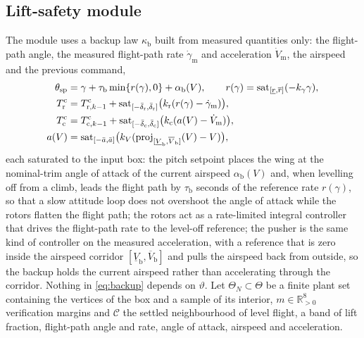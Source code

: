\subsection{Lift-safety module}\label{sec:lsm}
The module uses a backup law $\kappa_{\mathrm b}$ built from measured quantities only: the flight-path angle, the measured flight-path rate $\dot\gamma_{\mathrm m}$ and acceleration $\dot V_{\mathrm m}$, the airspeed and the previous command,
\begin{subequations}\label{eq:backup}
\begin{align}
\theta_{\mathrm{sp}}&=\gamma+\tau_{\mathrm b}\min\{r(\gamma),0\}+\alpha_{\mathrm b}(V),\qquad r(\gamma)=\mathrm{sat}_{[\underline r,\overline r]}(-k_\gamma\gamma),\label{eq:bk_th}\\
T^{\mathrm c}_{\mathrm r}&=T^{\mathrm c}_{\mathrm r,k-1}+\mathrm{sat}_{[-\bar\delta_{\mathrm r},\bar\delta_{\mathrm r}]}\big(k_{\mathrm r}(r(\gamma)-\dot\gamma_{\mathrm m})\big),\label{eq:bk_r}\\
T^{\mathrm c}_{\mathrm c}&=T^{\mathrm c}_{\mathrm c,k-1}+\mathrm{sat}_{[-\bar\delta_{\mathrm c},\bar\delta_{\mathrm c}]}\big(k_{\mathrm c}(a(V)-\dot V_{\mathrm m})\big),\label{eq:bk_c}\\
a(V)&=\mathrm{sat}_{[-\bar a,\bar a]}\big(k_V(\mathrm{proj}_{[\underline V_{\mathrm b},\overline V_{\mathrm b}]}(V)-V)\big),\nonumber
\end{align}
\end{subequations}
each saturated to the input box: the pitch setpoint places the wing at the nominal-trim angle of attack of the current airspeed $\alpha_{\mathrm b}(V)$ and, when levelling off from a climb, leads the flight path by $\tau_{\mathrm b}$ seconds of the reference rate $r(\gamma)$, so that a slow attitude loop does not overshoot the angle of attack while the rotors flatten the flight path; the rotors act as a rate-limited integral controller that drives the flight-path rate to the level-off reference; the pusher is the same kind of controller on the measured acceleration, with a reference that is zero inside the airspeed corridor $[\underline V_{\mathrm b},\overline V_{\mathrm b}]$ and pulls the airspeed back from outside, so the backup holds the current airspeed rather than accelerating through the corridor. Nothing in \eqref{eq:backup} depends on $\vartheta$. Let $\Theta_N\subset\Theta$ be a finite plant set containing the vertices of the box and a sample of its interior, $m\in\mathbb R^8_{>0}$ verification margins and $\mathcal C$ the settled neighbourhood of level flight, a band of lift fraction, flight-path angle and rate, angle of attack, airspeed and acceleration.
